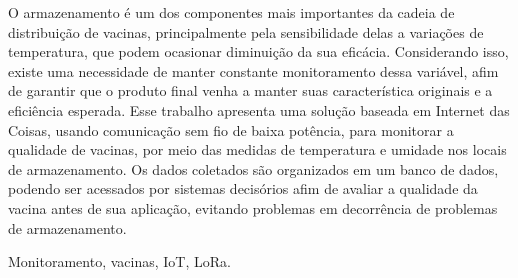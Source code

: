 \vspace{-2mm}
\begin{resumo}
O armazenamento é um dos componentes mais importantes da cadeia de distribuição de vacinas, principalmente pela sensibilidade delas a variações de temperatura, que podem ocasionar diminuição da sua eficácia. Considerando isso, existe uma necessidade de manter constante monitoramento dessa variável, afim de garantir que o produto final venha a manter suas característica originais e a eficiência esperada. Esse trabalho apresenta uma solução baseada em Internet das Coisas, usando comunicação sem fio de baixa potência, para monitorar a qualidade de vacinas, por meio das medidas de temperatura e umidade nos locais de armazenamento. Os dados coletados são organizados em um banco de dados, podendo ser acessados por sistemas decisórios afim de avaliar a qualidade da vacina antes de sua aplicação, evitando problemas em decorrência de problemas de armazenamento. %


\end{resumo}
\begin{chave}
    Monitoramento, vacinas, IoT, LoRa. 
\end{chave}


